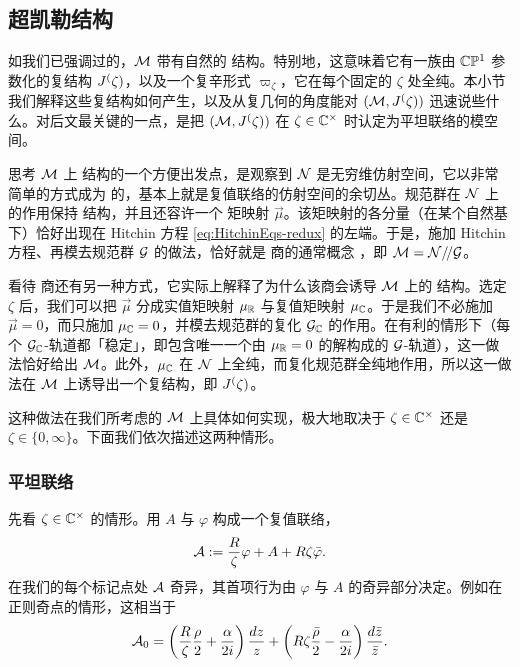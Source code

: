 \subsection{超凯勒结构}

如我们已强调过的，$\mathcal{M}$ 带有自然的 \hk 结构。特别地，这意味着它有一族由 $\mathbb{C}\mathbb{P}^1$ 参数化的复结构 $J^(\zeta)$，以及一个复辛形式 $\varpi_\zeta$，它在每个固定的 $\zeta$ 处全纯。本小节我们解释这些复结构如何产生，以及从复几何的角度能对 $(\mathcal{M}, J^(\zeta))$ 迅速说些什么。对后文最关键的一点，是把 $(\mathcal{M}, J^(\zeta))$ 在 $\zeta \in \mathbb{C}^\times$ 时认定为平坦联络的模空间。

思考 $\mathcal{M}$ 上 \hk 结构的一个方便出发点，是观察到 $\mathcal{N}$ 是无穷维仿射空间，它以非常简单的方式成为 \hk 的，基本上就是复值联络的仿射空间的余切丛。规范群在 $\mathcal{N}$ 上的作用保持 \hk 结构，并且还容许一个 \hk 矩映射 $\vec{\mu}$。该矩映射的各分量（在某个自然基下）恰好出现在 Hitchin 方程 \eqref{eq:HitchinEqs-redux} 的左端。于是，施加 Hitchin 方程、再模去规范群 $\mathcal{G}$ 的做法，恰好就是 \hk 商的通常概念 \cite{Hitchin:1986ea}，即 $\mathcal{M} = \mathcal{N} /\!/ \mathcal{G}$。

看待 \hk 商还有另一种方式，它实际上解释了为什么该商会诱导 $\mathcal{M}$ 上的 \hk 结构。选定 $\zeta$ 后，我们可以把 $\vec{\mu}$ 分成实值矩映射 $\mu_{\mathbb{R}}$ 与复值矩映射 $\mu_{\mathbb{C}}$。于是我们不必施加 $\vec{\mu} = 0$，而只施加 $\mu_{\mathbb{C}} = 0$，并模去规范群的复化 $\mathcal{G}_{\mathbb{C}}$ 的作用。在有利的情形下（每个 $\mathcal{G}_{\mathbb{C}}$-轨道都「稳定」，即包含唯一一个由 $\mu_{\mathbb{R}} = 0$ 的解构成的 $\mathcal{G}$-轨道），这一做法恰好给出 $\mathcal{M}$。此外，$\mu_{\mathbb{C}}$ 在 $\mathcal{N}$ 上全纯，而复化规范群全纯地作用，所以这一做法在 $\mathcal{M}$ 上诱导出一个复结构，即 $J^(\zeta)$。

这种做法在我们所考虑的 $\mathcal{M}$ 上具体如何实现，极大地取决于 $\zeta \in \mathbb{C}^\times$ 还是 $\zeta \in \{0,\infty\}$。下面我们依次描述这两种情形。

\subsubsection{平坦联络}

先看 $\zeta \in \mathbb{C}^\times$ 的情形。用 $A$ 与 $\varphi$ 构成一个复值联络，
\begin{equation} \label{eq:def-CA-hk}
\mathcal{A} : = \frac{R}{\zeta} \varphi + A + R \zeta \bar \varphi.
\end{equation}
在我们的每个标记点处 $\mathcal{A}$ 奇异，其首项行为由 $\varphi$ 与 $A$ 的奇异部分决定。例如在正则奇点的情形，这相当于
\begin{equation} \label{eq:A-sing-reg}
\mathcal{A}_0 = \left( \frac{R}{\zeta} \frac{\rho}{2}  + \frac{\alpha}{2i}
\right) \frac{dz}{z} +  \left( R \zeta \frac{\bar \rho}{2} -
\frac{\alpha}{2i} \right) \frac{d\bar{z}}{\bar{z}}.
\end{equation}

